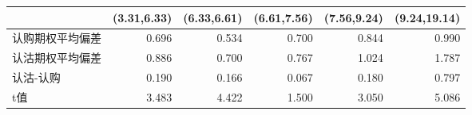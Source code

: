 \begin{tabularx}{\linewidth}{lrrrrr}
\toprule
{} &  (3.31,6.33) &  (6.33,6.61) &  (6.61,7.56) &  (7.56,9.24) &  (9.24,19.14) \\
\midrule
认购期权平均偏差 &  0.696 &  0.534 &  0.700 &  0.844 &  0.990 \\
认沽期权平均偏差 &  0.886 &  0.700 &  0.767 &  1.024 &  1.787 \\
认沽-认购    &  0.190 &  0.166 &  0.067 &  0.180 &  0.797 \\
t值       &  3.483 &  4.422 &  1.500 &  3.050 &  5.086 \\
\bottomrule
\end{tabularx}

